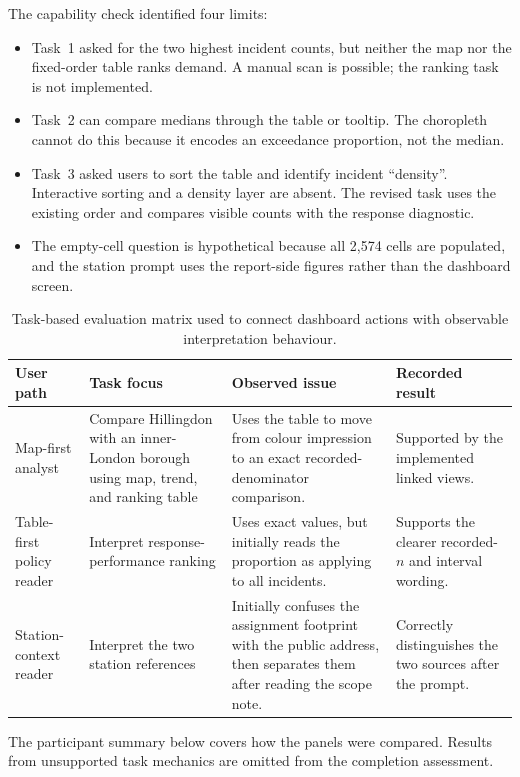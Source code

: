 The capability check identified four limits:
\begin{itemize}
    \item Task~1 asked for the two highest incident counts, but neither the map nor the fixed-order table ranks demand. A manual scan is possible; the ranking task is not implemented.
    \item Task~2 can compare medians through the table or tooltip. The choropleth cannot do this because it encodes an exceedance proportion, not the median.
    \item Task~3 asked users to sort the table and identify incident ``density''. Interactive sorting and a density layer are absent. The revised task uses the existing order and compares visible counts with the response diagnostic.
    \item The empty-cell question is hypothetical because all 2{,}574 cells are populated, and the station prompt uses the report-side figures rather than the dashboard screen.
\end{itemize}

\begin{table}[H]
\centering
\small
\begin{tabularx}{\textwidth}{p{2.4cm}p{3.2cm}p{4.3cm}X}
\toprule
User path & Task focus & Observed issue & Recorded result \\
\midrule
Map-first analyst & Compare Hillingdon with an inner-London borough using map, trend, and ranking table & Uses the table to move from colour impression to an exact recorded-denominator comparison. & Supported by the implemented linked views. \\
Table-first policy reader & Interpret response-performance ranking & Uses exact values, but initially reads the proportion as applying to all incidents. & Supports the clearer recorded-$n$ and interval wording. \\
Station-context reader & Interpret the two station references & Initially confuses the assignment footprint with the public address, then separates them after reading the scope note. & Correctly distinguishes the two sources after the prompt. \\
\bottomrule
\end{tabularx}
\caption{Task-based evaluation matrix used to connect dashboard actions with observable interpretation behaviour.}
\label{tab:task-evaluation-matrix}
\end{table}

The participant summary below covers how the panels were compared. Results from unsupported task mechanics are omitted from the completion assessment.

